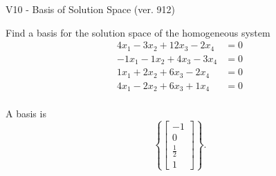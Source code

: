 \begin{exercise}
  \begin{exerciseTitle}V10 - Basis of Solution Space (ver. 912)\end{exerciseTitle}
  \begin{exerciseStatement}
    Find a basis for the solution space of the homogeneous system 
\begin{align*}
 4 x_ 1 -3 x_ 2 + 12 x_ 3 -2 x_ 4 &= 0  \\ 
  -1 x_ 1 -1 x_ 2 + 4 x_ 3 -3 x_ 4 &= 0  \\ 
  1 x_ 1 + 2 x_ 2 + 6 x_ 3 -2 x_ 4 &= 0  \\ 
  4 x_ 1 -2 x_ 2 + 6 x_ 3 + 1 x_ 4 &= 0  \\ 
 \end{align*}


 
  \end{exerciseStatement}

  \begin{exerciseAnswer}
   A basis is   
\[\left\{\left[\begin{array}{c}
-1 \\
0 \\
\frac{1}{2} \\
1
\end{array}\right]\right\}.\]

  


  \end{exerciseAnswer}
\end{exercise}